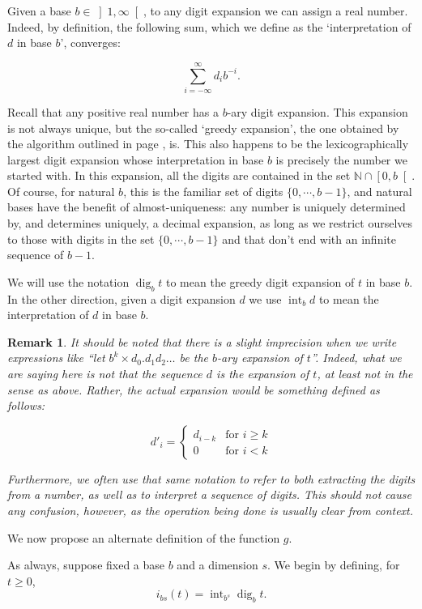 \documentclass[11pt, reqno]{amsart}
\newcommand{\N}{\mathbb{N}}
\newtheorem{remark}{Remark}
\DeclareMathOperator{\dig}{dig}
\DeclareMathOperator{\intr}{int}
\begin{document}
Given a base $b \in \left]1, \infty \right[$, to any digit expansion we can assign a real number. Indeed, by definition, the following sum, which we define as the `interpretation of $d$ in base $b$', converges:

\[ \sum_{i = -\infty}^\infty d_i b^{-i}.\]

Recall that any positive real number has a $b$-ary digit expansion. This expansion is not always unique, but the so-called `greedy expansion', the one obtained by the algorithm outlined in page \pageref{digalg}, is. This also happens to be the lexicographically largest digit expansion whose interpretation in base $b$ is precisely the number we started with. In this expansion, all the digits are contained in the set $\N \cap \left[0, b \right[$. Of course, for natural $b$, this is the familiar set of digits $\{0, \cdots, b-1 \}$, and natural bases have the benefit of almost-uniqueness: any number is uniquely determined by, and determines uniquely, a decimal expansion, as long as we restrict ourselves to those with digits in the set $\{0, \cdots, b-1 \}$ and that don't end with an infinite sequence of $b-1$.

We will use the notation $\dig_b t$ to mean the greedy digit expansion of $t$ in base $b$. In the other direction, given a digit expansion $d$ we use $\intr_b d$ to mean the interpretation of $d$ in base $b$.

\begin{remark}
It should be noted that there is a slight imprecision when we write expressions like ``let $b^k \times d_0 . d_1 d_2 \dots$ be the $b$-ary expansion of $t$''. Indeed, what we are saying here is not that the sequence $d$ is the expansion of $t$, at least not in the sense as above. Rather, the actual expansion would be something defined as follows:

\[d'_i =
\begin{cases}
d_{i-k} & \text{for $i \geq k$}\\
0 & \text{for $i < k$}
\end{cases}
\]

Furthermore, we often use that same notation to refer to both extracting the digits from a number, as well as to interpret a sequence of digits. This should not cause any confusion, however, as the operation being done is usually clear from context.
\end{remark}

We now propose an alternate definition of the function $g$.

As always, suppose fixed a base $b$ and a dimension $s$. We begin by defining, for $t \geq 0$,
\[ i_{bs}(t) = \intr_{b^s} \dig_b t.\]
\end{document}
